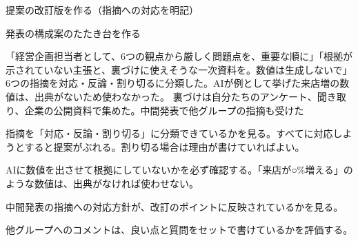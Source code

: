 \begin{nexttime}
  \item 提案の改訂版を作る（指摘への対応を明記）
  \item 発表の構成案のたたき台を作る
\end{nexttime}
{「経営企画担当者として、6つの観点から厳しく問題点を、重要な順に」「根拠が示されていない主張と、裏づけに使えそうな一次資料を。数値は生成しないで」}
{6つの指摘を対応・反論・割り切るに分類した。AIが例として挙げた来店増の数値は、出典がないため使わなかった。}
{裏づけは自分たちのアンケート、聞き取り、企業の公開資料で集めた。中間発表で他グループの指摘も受けた}

\begin{point}
  \item 指摘を「対応・反論・割り切る」に分類できているかを見る。すべてに対応しようとすると提案がぶれる。割り切る場合は理由が書けていればよい。
  \item AIに数値を出させて根拠にしていないかを必ず確認する。「来店が○\%増える」のような数値は、出典がなければ使わせない。
  \item 中間発表の指摘への対応方針が、改訂のポイントに反映されているかを見る。
  \item 他グループへのコメントは、良い点と質問をセットで書けているかを評価する。
\end{point}
